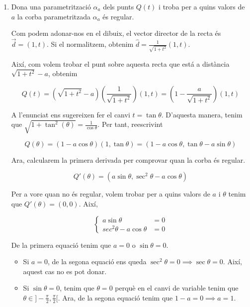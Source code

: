\documentclass[a4paper, 11pt]{article}
\begin{document}
  \begin{solution}
    \begin{enumerate}[label=(\alph*)]
      \item Dona una parametrització $\alpha_a$ dels punts $Q(t)$ i troba per a quins valors de $a$ la corba
      parametritzada $\alpha_a$ és regular.
    
      Com podem adonar-nos en el dibuix, el vector director de la recta és 
      $\vec{d} = (1,t)$. Si el normalitzem, obtenim $\hat{d} = \frac{1}{\sqrt{1+t^2}}(1,t)$.
    
      Així, com volem trobar el punt sobre aquesta recta que está a distància $\sqrt{1+t^2}-a$,
      obtenim
    
      $$Q(t) = (\sqrt{1+t^2}-a)\left(\frac{1}{\sqrt{1+t^2}}\right) (1,t) = \left(1-\frac{a}{\sqrt{1+t^2}}\right) (1,t)$$
    
      A l'enunciat ens sugereixen fer el canvi $t=\tan\theta$. D'aquesta manera, tenim que 
      $\sqrt{1+\tan^2 (\theta)} = \frac{1}{\cos \theta}$. Per tant, reescrivint
    
      $$Q (\theta) = (1- a\cos \theta)(1,\tan \theta) = (1-a\cos \theta, \tan \theta - a\sin \theta)$$
    
      Ara, calcularem la primera derivada per comprovar quan la corba és regular.
    
      $$
      Q'(\theta) = (a\sin \theta, \sec^2 \theta - a\cos \theta) 
      $$
    
      Per a vore quan no és regular, volem trobar per a quins valors de $a$ i $\theta$
      tenim que $Q'(\theta) = (0,0)$. Així,
    
      $$
      \begin{cases}
        a\sin\theta &= 0\\
        sec^2\theta - a\cos\theta &= 0
      \end{cases}
      $$
    
      De la primera equació tenim que $a=0$ o $\sin\theta = 0 $.
      
      \begin{itemize}
        \item Si $a=0$, de la segona equació ens queda $\sec^2 \theta = 0 \implies \sec \theta = 0$.
        Així, aquest cas no es pot donar.
      
        \item Si $\sin\theta = 0$, tenim que $\theta=0$ perquè en el canvi
        de variable tenim que $\theta \in ]-\frac{\pi}{2},\frac{\pi}{2}[$.
        Ara, de la segona equació tenim que $1-a=0 \implies a=1$.
      \end{itemize}
    

\end{enumerate}
\end{solution}
\end{document}
